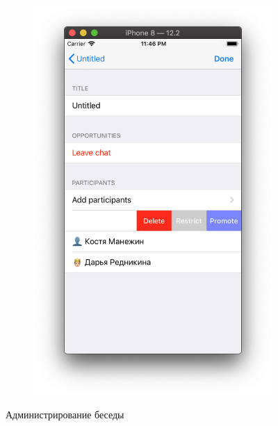 \documentclass[a4paper,12pt]{article}
\begin{document}
\begin{figure}[h!]
\begin{subfigure}[b]{0.3\linewidth}
			\includegraphics[width=\linewidth]{../includes/pmi/adminChange.png}
		\end{subfigure}
		\caption{\label{pic: admin}Администрирование беседы}
	\end{figure}
\clearpage
\end{document}
